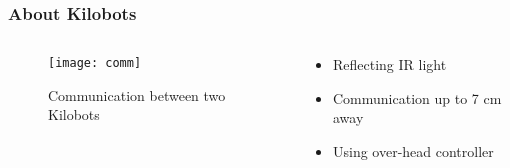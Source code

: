 \begin{frame}
	\frametitle{About Kilobots}
	\begin{columns}
		\begin{column}{0.4\textwidth}
			\begin{figure}
				\centering
				\texttt{[image: comm]}
				\caption{Communication between two Kilobots}
			\end{figure}
		\end{column}
		
		\begin{column}{0.45\textwidth}
			\begin{itemize}
				\item Reflecting IR light
				\item Communication up to 7 cm away 
				\item Using over-head controller
			\end{itemize}
		\end{column}
	\end{columns}
\end{frame}
